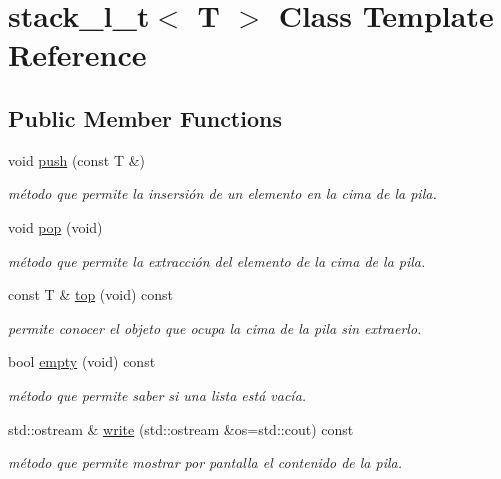 \hypertarget{classstack__l__t}{}\section{stack\+\_\+l\+\_\+t$<$ T $>$ Class Template Reference}
\label{classstack__l__t}
\subsection*{Public Member Functions}
\begin{DoxyCompactItemize}
\item 
void \hyperlink{classstack__l__t_ad52c8e787c587fa5d15bd0e3eea5814c}{push} (const T \&)
\begin{DoxyCompactList}\small\item\em método que permite la insersión de un elemento en la cima de la pila. \end{DoxyCompactList}\item 
\mbox{\label{classstack__l__t_a7141f555a4e69c55a061ba2b97a0869a}} 
void \hyperlink{classstack__l__t_a7141f555a4e69c55a061ba2b97a0869a}{pop} (void)
\begin{DoxyCompactList}\small\item\em método que permite la extracción del elemento de la cima de la pila. \end{DoxyCompactList}\item 
\mbox{\label{classstack__l__t_a1bc65ef2e0462ccbcd1e420e1b00440b}} 
const T \& \hyperlink{classstack__l__t_a1bc65ef2e0462ccbcd1e420e1b00440b}{top} (void) const
\begin{DoxyCompactList}\small\item\em permite conocer el objeto que ocupa la cima de la pila sin extraerlo. \end{DoxyCompactList}\item 
\mbox{\label{classstack__l__t_ac2ecd3303d1aecdec3e7794a6c65fbbc}} 
bool \hyperlink{classstack__l__t_ac2ecd3303d1aecdec3e7794a6c65fbbc}{empty} (void) const
\begin{DoxyCompactList}\small\item\em método que permite saber si una lista está vacía. \end{DoxyCompactList}\item 
\mbox{\label{classstack__l__t_a9cf23d151a2a00432918df203d322323}} 
std\+::ostream \& \hyperlink{classstack__l__t_a9cf23d151a2a00432918df203d322323}{write} (std\+::ostream \&os=std\+::cout) const
\begin{DoxyCompactList}\small\item\em método que permite mostrar por pantalla el contenido de la pila. \end{DoxyCompactList}\end{DoxyCompactItemize}


